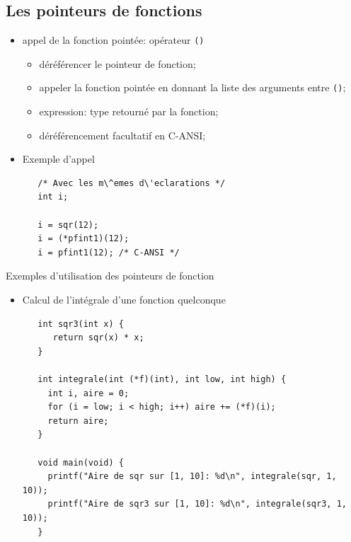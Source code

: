 \begin{frame} 

\section{Les pointeurs de fonctions}

\begin{itemize}
  \item appel de la fonction point\'ee: op\'erateur {\tt ()}
    \begin{itemize}
      \item d\'er\'ef\'erencer le pointeur de fonction;
      \item appeler la fonction point\'ee en donnant la liste des
        arguments entre {\tt ()};
      \item expression: type retourn\'e par la fonction;
      \item d\'er\'ef\'erencement facultatif en C-ANSI; 
    \end{itemize}
  \item Exemple d'appel
{\normalsize
\begin{verbatim}
   /* Avec les m\^emes d\'eclarations */
   int i;
  
   i = sqr(12);
   i = (*pfint1)(12);
   i = pfint1(12); /* C-ANSI */
\end{verbatim}
}
\end{itemize}
\newpage
 Exemples d'utilisation des pointeurs de fonction
\begin{itemize}
  \item Calcul de l'int\'egrale d'une fonction quelconque
{\normalsize
\begin{verbatim}
   int sqr3(int x) {
      return sqr(x) * x;
   }

   int integrale(int (*f)(int), int low, int high) {
     int i, aire = 0;
     for (i = low; i < high; i++) aire += (*f)(i);
     return aire;
   }

   void main(void) {
     printf("Aire de sqr sur [1, 10]: %d\n", integrale(sqr, 1, 10));
     printf("Aire de sqr3 sur [1, 10]: %d\n", integrale(sqr3, 1, 10));
   }
\end{verbatim}
}
\end{itemize}
\end{frame}

